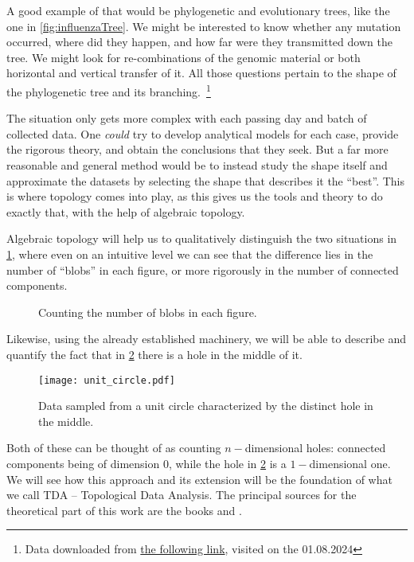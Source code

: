 \noindent
A good example of that would be phylogenetic and evolutionary trees, like the one in \ref{fig:influenzaTree}. We might be interested to know whether any mutation occurred, where did they happen, and how far were they transmitted down the tree. We might look for re-combinations of the genomic material or both horizontal and vertical transfer of it. All those questions pertain to the shape of the phylogenetic tree and its branching.\
\footnote{Data downloaded from \href{https://datadryad.org/stash/dataset/doi:10.5061/dryad.v15v0}{the following link},
  visited on the 01.08.2024}
\par
The situation only gets more complex with each passing day and batch of collected data. One \textit{could} try to develop analytical models for each case, provide the rigorous theory, and obtain the conclusions that they seek. But a far more reasonable and general method would be to instead study the shape itself and approximate the datasets by selecting the shape that describes it the ``best''. This is where topology comes into play, as this gives us the tools and theory to do exactly that, with the help of algebraic topology.
\par
Algebraic topology will help us to qualitatively distinguish the two situations in \ref{fig:Blobs}, where even on an intuitive level we can see that the difference lies in the number of ``blobs'' in each figure, or more rigorously in the number of connected components.

\begin{figure}[h]
  \centering
  \qquad
  \caption{Counting the number of blobs in each figure.}
  \label{fig:Blobs}
\end{figure}

\noindent
Likewise, using the already established machinery, we will be able to describe and quantify the fact that in \ref{fig:unit_circle} there is a hole in the middle of it.

\begin{figure}[h]
  \caption{Data sampled from a unit circle characterized by the distinct hole in the middle.}
  \texttt{[image: unit\_circle.pdf]}
  \centering
  \label{fig:unit_circle}
\end{figure}

\noindent
Both of these can be thought of as counting $n-$dimensional holes: connected components being of dimension $0$, while the hole in \ref{fig:unit_circle} is a $1-$dimensional one. We will see how this approach and its extension will be the foundation of what we call TDA -- Topological Data Analysis. The principal sources for the theoretical part of this work are the books \cite{dey2022computational} and \cite{rabadan2019topological}.
